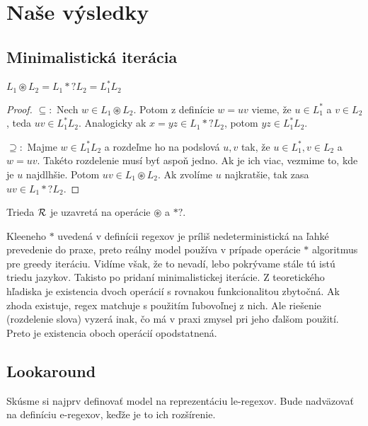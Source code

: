 \chapter{Naše výsledky}
\label{chap:vysledky}

\section{Minimalistická iterácia}
\label{iteracia}

\begin{veta}
$L_1 \circledast L_2 = L_1 *? L_2 = L_1^*L_2$
\end{veta}
\begin{proof}
$\subseteq:$
Nech $w \in L_1 \circledast L_2$. Potom z definície $w=uv$ vieme, že $u \in L_1^*$ a $v \in L_2$, teda $uv \in L_1^*L_2$. Analogicky ak $x=yz \in L_1 *? L_2$, potom $yz \in L_1^*L_2$.

$\supseteq:$
Majme $w \in L_1^*L_2$ a rozdeľme ho na podslová $u,v$ tak, že $u \in L_1^*, v \in L_2$ a $w=uv$. Takéto rozdelenie musí byť aspoň jedno. Ak je ich viac, vezmime to, kde je $u$ najdlhšie. Potom $uv \in L_1 \circledast L_2$. Ak zvolíme $u$ najkratšie, tak zasa $uv \in L_1 *? L_2$.
\end{proof}

\begin{dosledok}
Trieda ${\cal R}$ je uzavretá na operácie $\circledast$ a $*?$.
\end{dosledok}

Kleeneho $*$ uvedená v definícii regexov je príliš nedeterministická na ľahké prevedenie do praxe, preto reálny model používa v prípade operácie $*$ algoritmus pre greedy iteráciu. Vidíme však, že to nevadí, lebo pokrývame stále tú istú triedu jazykov. Takisto po pridaní minimalistickej iterácie. Z teoretického hľadiska je existencia dvoch operácií s rovnakou funkcionalitou  zbytočná. Ak zhoda existuje, regex matchuje s použitím ľubovoľnej z nich. Ale riešenie (rozdelenie slova) vyzerá inak, čo má v praxi zmysel pri jeho ďalšom použití. Preto je existencia oboch operácií opodstatnená.

\section{Lookaround}
\label{chap:lookahead}

Skúsme si najprv definovať model na reprezentáciu le-regexov. Bude nadväzovať na definíciu e-regexov, keďže je to ich rozšírenie.


